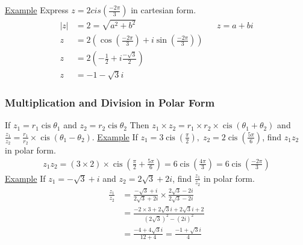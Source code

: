 \documentclass[a4paper]{article}
\DeclareMathOperator\cis{cis}
\begin{document}
					\underline{Example}\newline
					Express $z=2cis\left(\frac{-2\pi}{3}\right)$ in cartesian form.\newline
					\begin{align*}
						|z|&=2=\sqrt{a^2+b^2} && z=a+bi \\
						z&=2\left( \cos\left(\frac{-2\pi}{3}\right) + i\sin\left(\frac{-2\pi}{3}\right) \right) \\
						z&=2(-\frac{1}{2}+i\frac{-\sqrt{3}}{2}) \\
						z&=-1-\sqrt{3}i
					\end{align*}
			\subsubsection{Multiplication and Division in Polar Form}
				If $z_1=r_1\cis\theta_1$ and $z_2=r_2\cis\theta_2$ \newline\newline
				Then $z_1\times z_2 = r_1\times r_2\times\cis(\theta_1+\theta_2)$ \newline\newline and $\frac{z_1}{z_2}=\frac{r_1}{r_2}\times\cis(\theta_1-\theta_2)$.
				\newline\newline
				\underline{Example}\newline
				If $z_1=3\cis\left(\frac{\pi}{2}\right),\;z_2=2\cis\left(\frac{5\pi}{6}\right)$, find $z_1z_2$ in polar form.
				\begin{align*}
					z_1z_2=(3\times2)\times\cis\left(\frac{\pi}{2}+\frac{5\pi}{6}\right)=6\cis\left(\frac{4\pi}{3}\right)=6\cis\left(\frac{-2\pi}{3}\right)
				\end{align*}
				\newpage
				\noindent\underline{Example}\newline
				If $z_1=-\sqrt{3}+i$ and $z_2=2\sqrt{3}+2i$, find $\frac{z_1}{z_2}$ in polar form.
				\begin{align*}
					\frac{z_1}{z_2}&=\frac{-\sqrt{3}+i}{2\sqrt{3}+2i}\times\frac{2\sqrt{3}-2i}{2\sqrt{3}-2i} \\
					&=\frac{-2\times3+2\sqrt{3}i+2\sqrt{3}i+2}{(2\sqrt{3})^2-(2i)^2} \\
					&=\frac{-4+4\sqrt{3}i}{12+4}=\frac{-1+\sqrt{3}i}{4}
				\end{align*}
\end{document}
